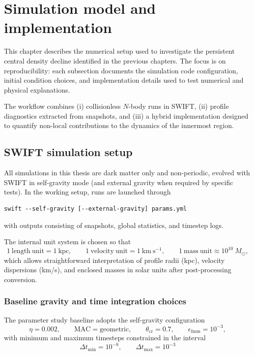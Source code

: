 \chapter{Simulation model and implementation}

This chapter describes the numerical setup used to investigate the persistent central density decline identified in the previous chapters. The focus is on reproducibility: each subsection documents the simulation code configuration, initial condition choices, and implementation details used to test numerical and physical explanations.

The workflow combines (i) collisionless $N$-body runs in SWIFT, (ii) profile diagnostics extracted from snapshots, and (iii) a hybrid implementation designed to quantify non-local contributions to the dynamics of the innermost region.

\section{SWIFT simulation setup}
\label{sec:framework_swift_setup}

All simulations in this thesis are dark matter only and non-periodic, evolved with SWIFT in self-gravity mode (and external gravity when required by specific tests). In the working setup, runs are launched through
\begin{verbatim}
swift --self-gravity [--external-gravity] params.yml
\end{verbatim}
with outputs consisting of snapshots, global statistics, and timestep logs.

The internal unit system is chosen so that
\begin{equation}
1\ \mathrm{length\ unit} = 1\ \mathrm{kpc}, \qquad
1\ \mathrm{velocity\ unit} = 1\ \mathrm{km\ s^{-1}}, \qquad
1\ \mathrm{mass\ unit} \approx 10^{10}\ M_{\odot},
\end{equation}
which allows straightforward interpretation of profile radii (kpc), velocity dispersions (km/s), and enclosed masses in solar units after post-processing conversion.

\subsection{Baseline gravity and time integration choices}

The parameter study baseline adopts the self-gravity configuration
\begin{equation}
\eta = 0.002, \qquad \mathrm{MAC}=\mathrm{geometric}, \qquad
\theta_{\mathrm{cr}}=0.7, \qquad \epsilon_{\mathrm{fmm}}=10^{-3},
\end{equation}
with minimum and maximum timesteps constrained in the interval
\begin{equation}
\Delta t_{\min}=10^{-8}, \qquad \Delta t_{\max}=10^{-3}
\end{equation}


